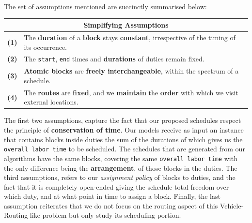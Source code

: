 \vspace{\baselineskip}
\noindent
The set of assumptions mentioned are succinctly summarised below:



	\begin{table}[ht]
	\renewcommand{\arraystretch}{1.7} %
		\centering
		\begin{tabular}{|c |p{}|} 
			\multicolumn{2}{c}{\textbf{Simplifying Assumptions}} \\
		    \hline
			\textbf{(1)}  & The \textbf{duration} of a \textbf{block} stays \textbf{constant}, irrespective of the timing of its occurrence.\\
            \hline
            \textbf{(2)}  & The \texttt{start}, \texttt{end} times and \textbf{durations} of duties remain fixed. \\
            \hline
            \textbf{(3)}  &\textbf{Atomic blocks} are \textbf{freely interchangeable}, within the spectrum of a schedule.\\
			\hline
			\textbf{(4)}  & The \textbf{routes} are \textbf{fixed}, and we \textbf{maintain} the \textbf{order} with which we visit external locations.\\
			\hline
		\end{tabular} 
	\end{table}
	
\vspace{\baselineskip}
\noindent
The first two assumptions, capture the fact that our proposed schedules respect the principle of \textbf{conservation of time}. Our models receive as input an instance that contains blocks inside duties the sum of the durations of which gives us the \texttt{overall labor time} to be scheduled. The schedules that are generated from our algorithms have the same blocks, covering the same \texttt{overall labor time} with the only difference being the \textbf{arrangement}, of those blocks in the duties. The third assumptions, refers to our \textit{assignment policy} of blocks to duties, and the fact that it is completely open-ended giving the schedule total freedom over which duty, and at what point in time to assign a block. Finally, the last assumption reiterates that we do not focus on the routing aspect of this Vehicle-Routing like problem but only study its scheduling portion.
	

